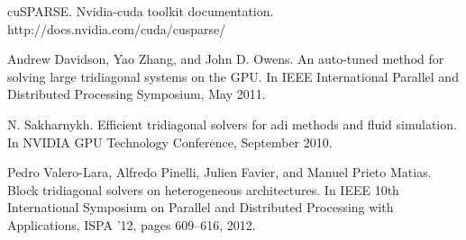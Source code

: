 \begin{thebibliography}{1}
  cuSPARSE. Nvidia-cuda toolkit documentation.
  http://docs.nvidia.com/cuda/cusparse/

  Andrew Davidson, Yao Zhang, and John D. Owens. An auto-tuned method for
solving large tridiagonal systems on the GPU. In IEEE International Parallel and
Distributed Processing Symposium, May 2011.

  N. Sakharnykh. Efficient tridiagonal solvers for adi methods and fluid simulation.
  In NVIDIA GPU Technology Conference, September 2010.

  Pedro Valero-Lara, Alfredo Pinelli, Julien Favier, and Manuel Prieto Matias. Block
tridiagonal solvers on heterogeneous architectures. In IEEE 10th International
Symposium on Parallel and Distributed Processing with Applications, ISPA ’12,
pages 609–616, 2012.
  \end{thebibliography}